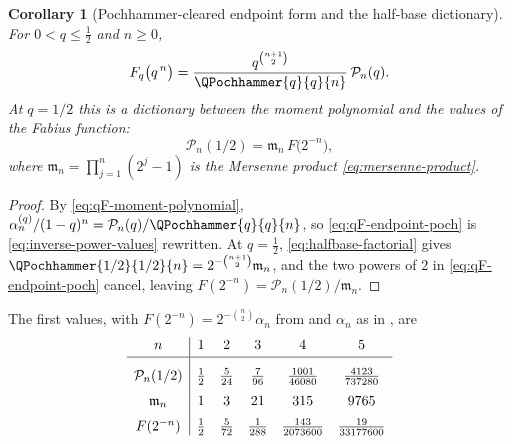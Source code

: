 \documentclass[11pt,a4paper,oneside,openany]{book}
\newtheorem{corollary}[corollary]{Corollary}
\theoremstyle{definition}
\theoremstyle{remark}
\begin{document}
\begin{corollary}[Pochhammer-cleared endpoint form and the half-base dictionary]
\label{cor:qF-halfbase-dictionary}
For $0<q\le\tfrac12$ and $n\ge0$,
\begin{equation}\label{eq:qF-endpoint-poch}
 F_q\bigl(q^{\,n}\bigr)=\frac{q^{\binom{n+1}2}}{\QPochhammer{q}{q}{n}}\,\mathcal P_n(q).
\end{equation}
At $q=1/2$ this is a dictionary between the moment polynomial and the values of the Fabius
function:
\begin{equation}\label{eq:qF-halfbase-dictionary}
 \mathcal P_n(1/2)=\mathfrak m_n\,F\bigl(2^{-n}\bigr),
\end{equation}
where $\mathfrak m_n=\prod_{j=1}^{n}(2^j-1)$ is the Mersenne product
\eqref{eq:mersenne-product}.
\end{corollary}

\begin{proof}
By \eqref{eq:qF-moment-polynomial}, $\alpha^{(q)}_n/(1-q)^n=\mathcal P_n(q)/\QPochhammer{q}{q}{n}$, so
\eqref{eq:qF-endpoint-poch} is \eqref{eq:inverse-power-values} rewritten.  At $q=\tfrac12$,
\eqref{eq:halfbase-factorial} gives
$\QPochhammer{1/2}{1/2}{n}=2^{-\binom{n+1}2}\mathfrak m_n$, and the two powers of $2$ in
\eqref{eq:qF-endpoint-poch} cancel, leaving
$F(2^{-n})=\mathcal P_n(1/2)/\mathfrak m_n$.
\end{proof}

The first values, with $F(2^{-n})=2^{-\binom n2}\alpha_n$ from
 and $\alpha_n$ as in , are
\[
 \begin{array}{c|ccccc}
  n & 1 & 2 & 3 & 4 & 5\\[2pt]\hline
  \rule{0pt}{16pt}
  \mathcal P_n(1/2) & \frac12 & \frac5{24} & \frac7{96}
    & \frac{1001}{46080} & \frac{4123}{737280}\\[6pt]
  \mathfrak m_n & 1 & 3 & 21 & 315 & 9765\\[6pt]
  F(2^{-n}) & \frac12 & \frac5{72} & \frac1{288}
    & \frac{143}{2073600} & \frac{19}{33177600}
 \end{array}
\]
\end{document}
